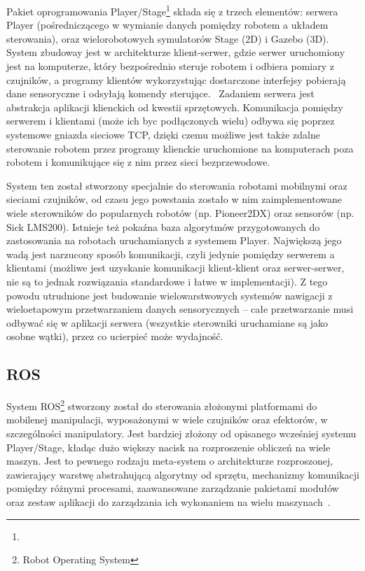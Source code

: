 Pakiet oprogramowania Player/Stage\footnote{}
składa się z trzech elementów: serwera Player (pośredniczącego w wymianie danych
pomiędzy robotem a układem sterowania), oraz wielorobotowych symulatorów Stage (2D)
i Gazebo (3D). System zbudoway jest w architekturze klient-serwer, gdzie serwer
uruchomiony jest na komputerze, który bezpośrednio steruje robotem i odbiera
pomiary z czujników, a programy klientów wykorzystując dostarczone interfejsy
pobierają dane sensoryczne i odsyłają komendy sterujące.~\cite{gerkey03playerstage}
Zadaniem serwera jest abstrakcja aplikacji klienckich od kwestii sprzętowych.
Komunikacja pomiędzy serwerem i klientami (może ich byc podłączonych wielu)
odbywa się poprzez systemowe gniazda sieciowe TCP, dzięki czemu możliwe jest także
zdalne sterowanie robotem przez programy klienckie uruchomione na komputerach poza
robotem i komunikujące się z nim przez sieci bezprzewodowe.

System ten został stworzony specjalnie do sterowania robotami mobilnymi oraz sieciami
czujników, od czasu jego powstania zostało w nim zaimplementowane wiele sterowników
do popularnych robotów (np. Pioneer2DX) oraz sensorów (np. Sick LMS200). Istnieje
też pokaźna baza algorytmów przygotowanych do zastosowania na robotach uruchamianych
z systemem Player. Największą jego wadą jest narzucony sposób komunikacji, czyli
jedynie pomiędzy serwerem a klientami (możliwe jest uzyskanie komunikacji klient-klient
oraz serwer-serwer, nie są to jednak rozwiązania standardowe i łatwe w implementacji).
Z tego powodu utrudnione jest budowanie wielowarstwowych systemów nawigacji z wieloetapowym
przetwarzaniem danych sensorycznych -- całe przetwarzanie musi odbywać się w aplikacji
serwera (wszystkie sterowniki uruchamiane są jako osobne wątki), przez co ucierpieć
może wydajność.

\subsection{ROS}

System ROS\footnote{Robot Operating System} stworzony został
do sterowania złożonymi platformami do mobilenej manipulacji, wyposażonymi w wiele
czujników oraz efektorów, w szczególności manipulatory. Jest bardziej złożony od
opisanego wcześniej systemu Player/Stage, kładąc dużo większy nacisk na rozproszenie
obliczeń na wiele maszyn. Jest to pewnego rodzaju meta-system o architekturze rozproszonej,
zawierający warstwę abstrahującą algorytmy od sprzętu, mechanizmy komunikacji
pomiędzy różnymi procesami, zaawansowane zarządzanie pakietami modułów oraz zestaw
aplikacji do zarządzania ich wykonaniem na wielu maszynach~\cite{288}.

